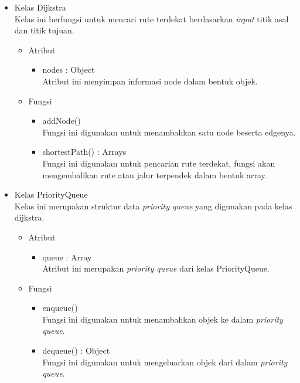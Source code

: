 \begin{itemize}
  \item Kelas Dijkstra\\
  Kelas ini berfungsi untuk mencari rute terdekat berdasarkan \textit{input}
  titik asal dan titik tujuan.
  \begin{itemize}
    \item Atribut
    \begin{itemize}
      \item nodes : Object\\
      Atribut ini menyimpan informasi node dalam bentuk objek.
    \end{itemize}
  \end{itemize}
  \begin{itemize}
    \item Fungsi
    \begin{itemize}
      \item addNode()\\
      Fungsi ini digunakan untuk menambahkan satu node beserta edgenya.
      
      \item shortestPath() : Arrays\\
      Fungsi ini digunakan untuk pencarian rute terdekat, fungsi akan
      mengembalikan rute atau jalur terpendek dalam bentuk array.
    \end{itemize}
  \end{itemize}
  
  \item Kelas PriorityQueue\\
  Kelas ini merupakan struktur data \textit{priority queue} yang digunakan pada
  kelas dijkstra.
  \begin{itemize}
    \item Atribut
    \begin{itemize}
      \item queue : Array\\
      Atribut ini merupakan \textit{priority queue} dari kelas PriorityQueue.
    \end{itemize}
  \end{itemize}
  \begin{itemize}
    \item Fungsi
    \begin{itemize}
      \item enqueue()\\
      Fungsi ini digunakan untuk menambahkan objek ke dalam \textit{priority
      queue}.
      
      \item dequeue() : Object\\
      Fungsi ini digunakan untuk mengeluarkan objek dari dalam \textit{priority
      queue}.
      

\end{itemize}
\end{itemize}
\end{itemize}
